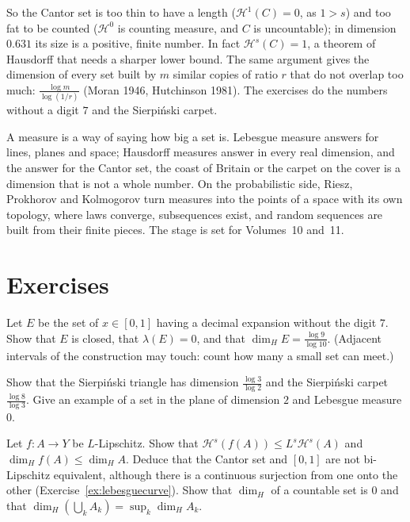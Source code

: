 So the Cantor set is too thin to have a length ($\mathcal H^1(C)=0$, as $1>s$) and too fat to be counted ($\mathcal H^0$ is counting measure, and $C$ is uncountable); in dimension $0.631$ its size is a positive, finite number.
In fact $\mathcal H^s(C)=1$, a theorem of Hausdorff that needs a sharper lower bound. The same argument gives the dimension of every set built by $m$ similar copies of ratio $r$ that do not overlap too much:
$\frac{\log m}{\log(1/r)}$ (Moran 1946, Hutchinson 1981). The exercises do the numbers without a digit $7$ and the Sierpi\'nski carpet.

\begin{beauty}
A measure is a way of saying how big a set is. Lebesgue measure answers for lines, planes and space; Hausdorff measures answer in every real dimension, and the answer for the Cantor set, the coast of
Britain or the carpet on the cover is a dimension that is not a whole number. On the probabilistic side, Riesz, Prokhorov and Kolmogorov turn measures into the points of a space with its own topology, where laws
converge, subsequences exist, and random sequences are built from their finite pieces. The stage is set for Volumes~10 and~11.
\end{beauty}

\section{Exercises}

\begin{exercise}[$\star$]\label{ex:nodigit7}
Let $E$ be the set of $x\in[0,1]$ having a decimal expansion without the digit $7$. Show that $E$ is closed, that $\lambda(E)=0$, and that $\dim_HE=\frac{\log9}{\log10}$. (Adjacent intervals of the construction may touch: count how many a
small set can meet.)
\end{exercise}

\begin{exercise}[$\star\star$]\label{ex:carpet}
Show that the Sierpi\'nski triangle has dimension $\frac{\log3}{\log2}$ and the Sierpi\'nski carpet $\frac{\log8}{\log3}$. Give an example of a set in the plane of dimension $2$ and Lebesgue measure $0$.
\end{exercise}

\begin{exercise}[$\star$]\label{ex:lipschitzdim}
Let $f:A\to Y$ be $L$-Lipschitz. Show that $\mathcal H^s(f(A))\le L^s\mathcal H^s(A)$ and $\dim_Hf(A)\le\dim_HA$. Deduce that the Cantor set and $[0,1]$ are not bi-Lipschitz equivalent, although there is a continuous surjection from
one onto the other (Exercise~\ref{ex:lebesguecurve}). Show that $\dim_H$ of a countable set is $0$ and that $\dim_H(\bigcup_kA_k)=\sup_k\dim_HA_k$.
\end{exercise}

